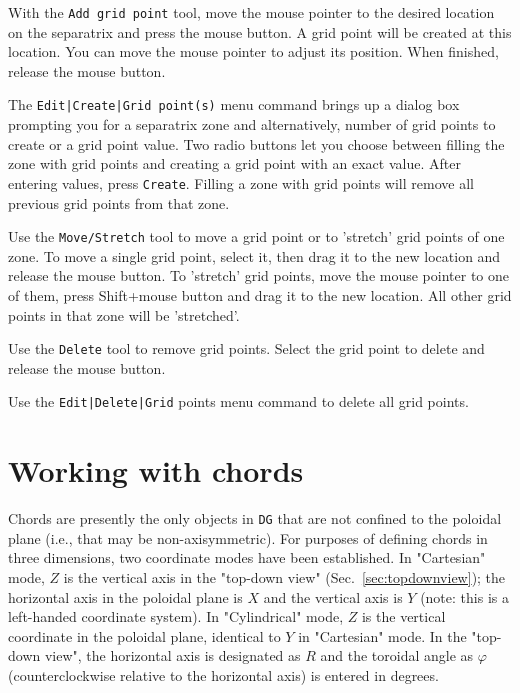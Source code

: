 \documentclass[a4paper,10pt]{report}
\begin{document}
With the {\tt Add grid point} tool, move the mouse pointer to the
desired location on the separatrix and press the mouse button. A grid
point will be created at this location. You can move the mouse pointer
to adjust its position. When finished, release the mouse button.

The {\tt Edit|Create|Grid point(s)} menu command brings up a dialog
box prompting you for a separatrix zone and alternatively, number of
grid points to create or a grid point value. Two radio buttons let you
choose between filling the zone with grid points and creating a grid
point with an exact value. After entering values, press {\tt Create}.
Filling a zone with grid points will remove all previous grid points
from that zone.

Use the {\tt Move/Stretch} tool to move a grid point or to 'stretch'
grid points of one zone. To move a single grid point, select it, then
drag it to the new location and release the mouse button. To 'stretch'
grid points, move the mouse pointer to one of them, press Shift+mouse
button and drag it to the new location. All other grid points in that
zone will be 'stretched'.

Use the {\tt Delete} tool to remove grid points. Select the grid
point to delete and release the mouse button.

Use the {\tt Edit|Delete|Grid} points menu command to delete all grid
points.

\section{Working with chords}
\label{sec:chords}

Chords are presently the only objects in {\tt DG} that are not confined to the
poloidal plane (i.e., that may be non-axisymmetric).
For purposes of defining chords in three
dimensions, two coordinate
modes have been established.
In "Cartesian" mode, $Z$ is the
vertical axis in the "top-down view" (Sec.~\ref{sec:topdownview});
the horizontal axis in the poloidal plane is $X$ and the
vertical axis is $Y$ (note: this is a left-handed coordinate system).
In "Cylindrical" mode, $Z$ is the vertical coordinate in the poloidal
plane, identical to $Y$ in "Cartesian" mode.
In the "top-down view",
the horizontal axis is
designated as $R$ and the toroidal angle as $\varphi$ (counterclockwise relative
to the horizontal axis) is entered in degrees.
\end{document}
